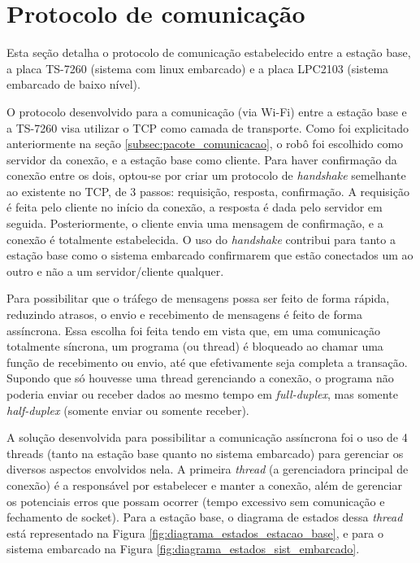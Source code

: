 \section{Protocolo de comunicação}

Esta seção detalha o protocolo de comunicação estabelecido entre a estação base, a placa TS-7260 (sistema com linux embarcado) e a placa LPC2103 (sistema embarcado de baixo nível).

O protocolo desenvolvido para a comunicação (via Wi-Fi) entre a estação base e a TS-7260 visa utilizar o TCP como camada de transporte. Como foi explicitado anteriormente na seção \ref{subsec:pacote_comunicacao}, o robô foi escolhido como servidor da conexão, e a estação base como cliente. Para haver confirmação da conexão entre os dois, optou-se por criar um protocolo de \textit{handshake} semelhante ao existente no TCP, de 3 passos: requisição, resposta, confirmação. A requisição é feita pelo cliente no início da conexão, a resposta é dada pelo servidor em seguida. Posteriormente, o cliente envia uma mensagem de confirmação, e a conexão é totalmente estabelecida. O uso do \textit{handshake} contribui para tanto a estação base como o sistema embarcado confirmarem que estão conectados um ao outro e não a um servidor/cliente qualquer.

Para possibilitar que o tráfego de mensagens possa ser feito de forma rápida, reduzindo atrasos, o envio e recebimento de mensagens é feito de forma assíncrona.
Essa escolha foi feita tendo em vista que, em uma comunicação totalmente síncrona, um programa (ou thread) é bloqueado ao chamar uma função de recebimento ou envio, até que efetivamente seja completa a transação. Supondo que só houvesse uma thread gerenciando a conexão, o programa não poderia enviar ou receber dados ao mesmo tempo em \textit{full-duplex}, mas somente \textit{half-duplex} (somente enviar ou somente receber).

A solução desenvolvida para possibilitar a comunicação assíncrona foi o uso de 4 threads (tanto na estação base quanto no sistema embarcado) para gerenciar os diversos aspectos envolvidos nela. A primeira \textit{thread} (a gerenciadora principal de conexão) é a responsável por estabelecer e manter a conexão, além de gerenciar os potenciais erros que possam ocorrer (tempo excessivo sem comunicação e fechamento de socket). Para a estação base, o diagrama de estados dessa \textit{thread} está representado na Figura \ref{fig:diagrama_estados_estacao_base}, e para o sistema embarcado na Figura \ref{fig:diagrama_estados_sist_embarcado}.

